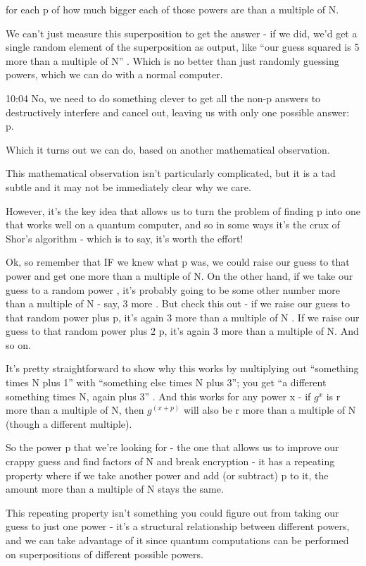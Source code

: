 \documentclass[../main.tex]{subfiles}
\begin{document}
for each p of how much bigger each of those powers are than a multiple of N.

We can’t just measure this superposition to get the answer - if we did, we’d get a single random element of the superposition as output, like “our guess squared is 5 more than a multiple of N” . Which is no better than just randomly guessing powers, which we can do with a normal computer.

10:04	No, we need to do something clever to get all the non-p answers to destructively interfere and cancel out, leaving us with only one possible answer: p.

Which it turns out we can do, based on another mathematical observation.

This mathematical observation isn’t particularly complicated, but it is a tad subtle and it may not be immediately clear why we care.

However, it’s the key idea that allows us to turn the problem of finding p into one that works well on a quantum computer, and so in some ways it’s the crux of Shor’s algorithm - which is to say, it’s worth the effort!

Ok, so remember that IF we knew what p was, we could raise our guess to that power and get one more than a multiple of N. On the other hand, if we take our guess to a random power , it’s probably going to be some other number more than a multiple of N - say, 3 more . But check this out - if we raise our guess to that random power plus p, it’s again 3 more than a multiple of N . If we raise our guess to that random power plus 2 p, it’s again 3 more than a multiple of N. And so on.

It’s pretty straightforward to show why this works by multiplying out “something times N plus 1” with “something else times N plus 3”; you get “a different something times N, again plus 3” . And this works for any power x - if $g^x$ is r more than a multiple of N, then $g^(x+p)$ will also be r more than a multiple of N (though a different multiple).

So the power p that we’re looking for - the one that allows us to improve our crappy guess and find factors of N and break encryption - it has a repeating property where if we take another power and add (or subtract) p to it, the amount more than a multiple of N stays the same.

This repeating property isn’t something you could figure out from taking our guess to just one power - it’s a structural relationship between different powers, and we can take advantage of it since quantum computations can be performed on superpositions of different possible powers.
\end{document}
